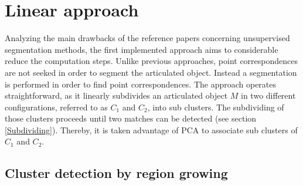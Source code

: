 \chapter{Linear approach}
\label{cha:LinearApproach}


Analyzing the main drawbacks of the reference papers concerning unsupervised segmentation methods, the first implemented approach aims to considerable reduce the computation steps. Unlike previous approaches, point correspondences are not seeked in order to segment the articulated object. Instead a segmentation is performed in order to find point correspondences. The approach operates straightforward, as it linearly subdivides an articulated object $M$ in two different configurations, referred to as $C_1$ and $C_2$, into sub clusters. The subdividing of those clusters proceeds until two matches can be detected (see section \ref{Subdividing}). Thereby, it is taken advantage of PCA to associate sub clusters of $C_1$ and $C_2$.

\section{Cluster detection by region growing}
\label{clustering}


